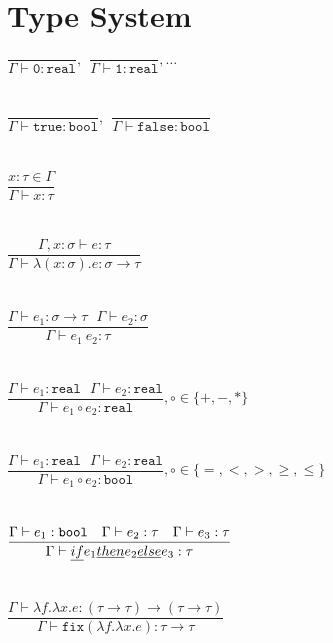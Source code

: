 \documentclass{westhesis}
\theoremstyle{plain}
\theoremstyle{definition}
\begin{document}
\section{Type System}
$\dfrac{}{\Gamma \vdash \texttt{0}: \texttt{real}}, \ \ \dfrac{}{\Gamma \vdash \texttt{1}: \texttt{real}}, \ldots$ \\ \\ \\
$\dfrac{}{\Gamma \vdash \texttt{true} : \texttt{bool}}, \ \ \dfrac{}{\Gamma \vdash \texttt{false} : \texttt{bool}}$ \\ \\ \\
$\dfrac{x : \tau \in \Gamma}{\Gamma \vdash x : \tau }$ \\ \\ \\
$\dfrac{\Gamma, x : \sigma \vdash e : \tau}{\Gamma \vdash \lambda (x : \sigma).e : \sigma \rightarrow \tau }$ \\ \\ \\ 
$\dfrac{\Gamma \vdash e_1: \sigma \rightarrow \tau \ \ \ \Gamma \vdash e_2 : \sigma}{\Gamma \vdash e_1 \ e_2 : \tau}$ \\ \\ \\
$\dfrac{\Gamma \vdash e_1 : \texttt{real} \ \ \ \Gamma \vdash e_2 : \texttt{real}}{\Gamma \vdash e_1 \circ e_2 : \texttt{real}}
, \circ \in \{+,-,*\}$ \\ \\ \\
$\dfrac{\Gamma \vdash e_1 : \texttt{real} \ \ \ \Gamma \vdash e_2 : \texttt{real}}{\Gamma \vdash e_1 \circ e_2 : \texttt{bool}}
, \circ \in \{=, <, >, \geq, \leq\}$ \\ \\ \\
$\dfrac{\Gamma \vdash e_1 : \texttt{bool} \ \ \ \Gamma \vdash e_2 : \tau \ \ \ \Gamma \vdash e_3 : \tau}
{\Gamma \vdash \emph{if } e_1 \emph{ then } e_2 \emph{ else } e_3 : \tau} $ \\ \\ \\
$\dfrac{\Gamma \vdash \lambda f. \lambda x.e : (\tau \rightarrow \tau) \rightarrow (\tau \rightarrow \tau)}
{\Gamma \vdash \texttt{fix}(\lambda f. \lambda x.e) : \tau \rightarrow \tau}$ \\ \\ \\ 
\end{document}
